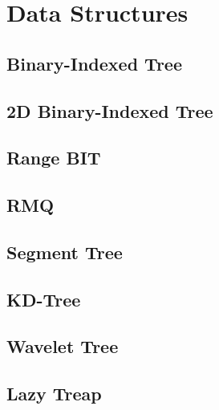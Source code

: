 \section{Data Structures}
\subsection{Binary-Indexed Tree}
\raggedbottom
\hrulefill
\subsection{2D Binary-Indexed Tree}
\raggedbottom
\hrulefill
\subsection{Range BIT}
\raggedbottom
\hrulefill
\subsection{RMQ}
\raggedbottom
\hrulefill
\subsection{Segment Tree}
\raggedbottom
\hrulefill
\subsection{KD-Tree}
\raggedbottom
\hrulefill
\subsection{Wavelet Tree}
\raggedbottom
\hrulefill
\subsection{Lazy Treap}
\raggedbottom
\hrulefill
